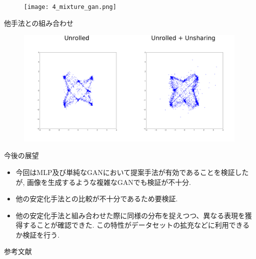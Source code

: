 \documentclass[dvipdfmx,12pt,unicode]{beamer}
\begin{document}
\begin{frame}
  \begin{figure}[htb]
    \begin{center}
      \texttt{[image: 4\_mixture\_gan.png]}
    \end{center}
  \end{figure}
\end{frame}

\begin{frame}{他手法との組み合わせ}
  \begin{figure}[htb]
    \begin{center}
      \includegraphics[width=\linewidth]{unrolled.png}
    \end{center}
  \end{figure}
\end{frame}

\begin{frame}{今後の展望}
  \begin{itemize}
  \item 今回はMLP及び単純なGANにおいて提案手法が有効であることを検証したが, 画像を生成するような複雑なGANでも検証が不十分.
  \item 他の安定化手法との比較が不十分であるため要検証.
  \item 他の安定化手法と組み合わせた際に同様の分布を捉えつつ、異なる表現を獲得することが確認できた.
    この特性がデータセットの拡充などに利用できるか検証を行う.
  \end{itemize}
\end{frame}

\begin{frame}[allowframebreaks]{参考文献}
  \beamertemplatetextbibitems


\end{frame}
\end{document}
